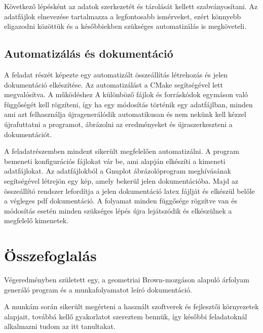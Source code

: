 \documentclass[a4paper, 12pt]{article}
\numberwithin{equation}{section}          %
\numberwithin{figure}{subsection}
\begin{document}
		Következő lépésként az adatok szerkezetét és tárolását kellett szabványosítani.
		Az adatfájlok elnevezése tartalmazza a legfontosabb ismérveket, ezért könnyebb eligazodni
		közöttük és a későbbiekben szükséges automatizálás is megköveteli.
		
		\subsection{Automatizálás és dokumentáció}
		
		A feladat részét képezte egy automatizált összeállítás létrehozás és jelen dokumentáció
		elkészítése. Az automatizálást a CMake segítségével lett megvalósítva. A működéshez
		A különböző fájlok és forráskódok egymáson való függőségét kell rögzíteni, így ha
		egy módosítás történik egy adatfájlban, minden ami azt felhasználja újragenerálódik
		automatikusan és nem nekünk kell kézzel újrafuttatni a programot, ábrázolni az 
		eredményeket és újraszerkeszteni a dokumentációt.
		
		A feladatrészemben mindent sikerült megfelelően automatizálni. A program bemeneti
		konfigurációs fájlokat vár be, ami alapján elkészíti a kimeneti adatfájlokat. Az
		adatfájlokból a Gnuplot ábrázolóprogram meghívásának segítségével létrejön egy kép,
		amely bekerül jelen dokumentációba. Majd az összeállító rendszer lefordítja a jelen 
		dokumentáció latex fájlját és elkészül belőle a végleges pdf dokumentáció.
		A folyamat minden függősége rögzítve van és módosítás esetén minden szükséges lépés
		újra lejátszódik és elkészülnek a megfelelő kimenetek.
	
	
	\vspace*{2cm}
	\section{Összefoglalás}
	
		Végeredményben született egy, a geometriai Brown-mozgáson alapuló árfolyam generáló
		program és a munkafolyamatot leíró dokumentáció.
	
		A munkám során sikerült megérteni a használt szoftverek és fejlesztői környezetek
		alapjait, továbbá kellő gyakorlatot szereztem bennük, így későbbi feladatoknál
		alkalmazni tudom az itt tanultakat.
	
\end{document}
